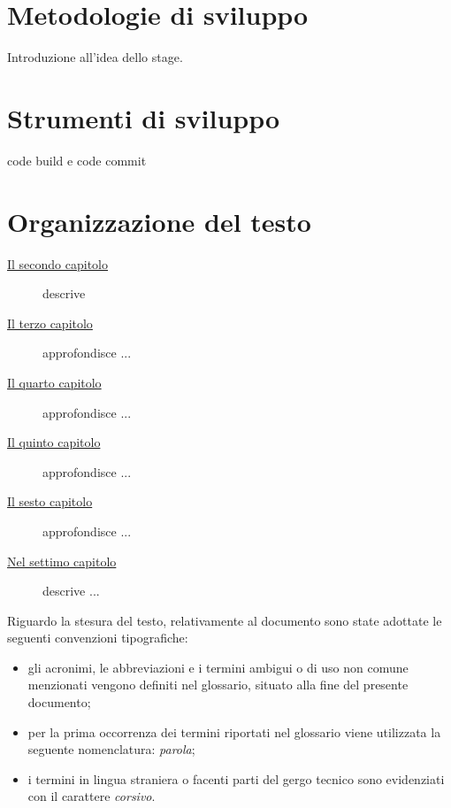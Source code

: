 \section{Metodologie di sviluppo}

Introduzione all'idea dello stage.

\section{Strumenti di sviluppo}
code build e code commit 

\section{Organizzazione del testo}

\begin{description}
    \item[{\hyperref[cap:processi-metodologie]{Il secondo capitolo}}] descrive 
    
    \item[{\hyperref[cap:descrizione-stage]{Il terzo capitolo}}] approfondisce ...
    
    \item[{\hyperref[cap:analisi-requisiti]{Il quarto capitolo}}] approfondisce ...
    
    \item[{\hyperref[cap:progettazione-codifica]{Il quinto capitolo}}] approfondisce ...
    
    \item[{\hyperref[cap:verifica-validazione]{Il sesto capitolo}}] approfondisce ...
    
    \item[{\hyperref[cap:conclusioni]{Nel settimo capitolo}}] descrive ...
\end{description}

Riguardo la stesura del testo, relativamente al documento sono state adottate le seguenti convenzioni tipografiche:
\begin{itemize}
	\item gli acronimi, le abbreviazioni e i termini ambigui o di uso non comune menzionati vengono definiti nel glossario, situato alla fine del presente documento;
	\item per la prima occorrenza dei termini riportati nel glossario viene utilizzata la seguente nomenclatura: \emph{parola}\glsfirstoccur;
	\item i termini in lingua straniera o facenti parti del gergo tecnico sono evidenziati con il carattere \emph{corsivo}.
\end{itemize}
